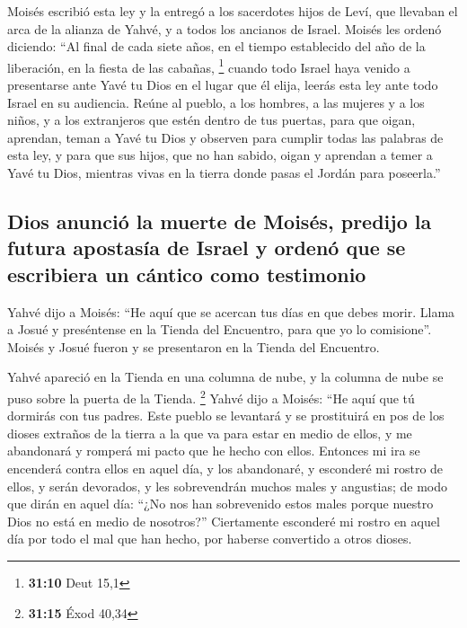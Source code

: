 \begin{paracol}{2}
 Moisés escribió esta ley y la entregó a los sacerdotes
hijos de Leví, que llevaban el arca de la alianza de Yahvé, y a todos
los ancianos de Israel.  Moisés les ordenó diciendo: ``Al
final de cada siete años, en el tiempo establecido del año de la
liberación, en la fiesta de las cabañas, \footnote{\textbf{31:10} Deut
  15,1}  cuando todo Israel haya venido a presentarse
ante Yavé tu Dios en el lugar que él elija, leerás esta ley ante todo
Israel en su audiencia.  Reúne al pueblo, a los hombres,
a las mujeres y a los niños, y a los extranjeros que estén dentro de tus
puertas, para que oigan, aprendan, teman a Yavé tu Dios y observen para
cumplir todas las palabras de esta ley,  y para que sus
hijos, que no han sabido, oigan y aprendan a temer a Yavé tu Dios,
mientras vivas en la tierra donde pasas el Jordán para poseerla.''

\hypertarget{dios-anunciuxf3-la-muerte-de-moisuxe9s-predijo-la-futura-apostasuxeda-de-israel-y-ordenuxf3-que-se-escribiera-un-cuxe1ntico-como-testimonio}{%
\subsection{Dios anunció la muerte de Moisés, predijo la futura
apostasía de Israel y ordenó que se escribiera un cántico como
testimonio}\label{dios-anunciuxf3-la-muerte-de-moisuxe9s-predijo-la-futura-apostasuxeda-de-israel-y-ordenuxf3-que-se-escribiera-un-cuxe1ntico-como-testimonio}}

 Yahvé dijo a Moisés: ``He aquí que se acercan tus días
en que debes morir. Llama a Josué y preséntense en la Tienda del
Encuentro, para que yo lo comisione''. Moisés y Josué fueron y se
presentaron en la Tienda del Encuentro.

 Yahvé apareció en la Tienda en una columna de nube, y la
columna de nube se puso sobre la puerta de la Tienda. \footnote{\textbf{31:15}
  Éxod 40,34}  Yahvé dijo a Moisés: ``He aquí que tú
dormirás con tus padres. Este pueblo se levantará y se prostituirá en
pos de los dioses extraños de la tierra a la que va para estar en medio
de ellos, y me abandonará y romperá mi pacto que he hecho con ellos.
 Entonces mi ira se encenderá contra ellos en aquel día,
y los abandonaré, y esconderé mi rostro de ellos, y serán devorados, y
les sobrevendrán muchos males y angustias; de modo que dirán en aquel
día: ``¿No nos han sobrevenido estos males porque nuestro Dios no está
en medio de nosotros?''  Ciertamente esconderé mi rostro
en aquel día por todo el mal que han hecho, por haberse convertido a
otros dioses.


\end{paracol}
